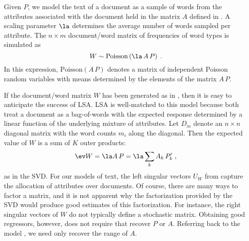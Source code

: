 \documentclass[12pt]{article}
\begin{document}
Given $P$, we model the text of a document as a sample of words from the attributes associated with the document held in the matrix $A$ defined in .   A scaling parameter $\la$ determines the average number of words sampled per attribute.  The $n \times m$ document/word matrix of  frequencies of word types is simulated as
\begin{equation}
	W \sim \mbox{Poisson} \left(\la \, A \, P \right) \;.
  \label{eq:simW}
\end{equation}
In this expression, $\mbox{Poisson}(A\,P)$ denotes a matrix of independent Poisson random variables with means determined by the elements of the matrix $A\,P$.

 
 If the document/word matrix $W$ has been generated as in , then it is easy to anticipate the success of LSA. LSA is well-matched to this model because both treat a document as a bag-of-words with the expected response determined by a linear function of the underlying mixture of attributes.  Let $D_m$ denote an $n \times n$ diagonal matrix with the  word counts $m_i$ along the diagonal.  Then the expected value of $W$ is a sum of $K$ outer products:
\begin{equation}
    \ev W = \la A\, P = \la \sum_k A_k \, P_k' \;,
  \label{eq:EW}
\end{equation}
as in the SVD.  For our models of text, the left singular vectors $U_W$ from  capture the allocation of attributes over documents.  Of course, there are many ways to factor a matrix, and it is not apparent why the factorization provided by the SVD would produce good estimates of this factorization.  For instance, the right singular vectors of $W$ do not typically define a stochastic matrix.  Obtaining good regressors, however, does not require that recover $P$ or $A$.  Referring back to the model , we need only recover the range of $A$.
\end{document}

